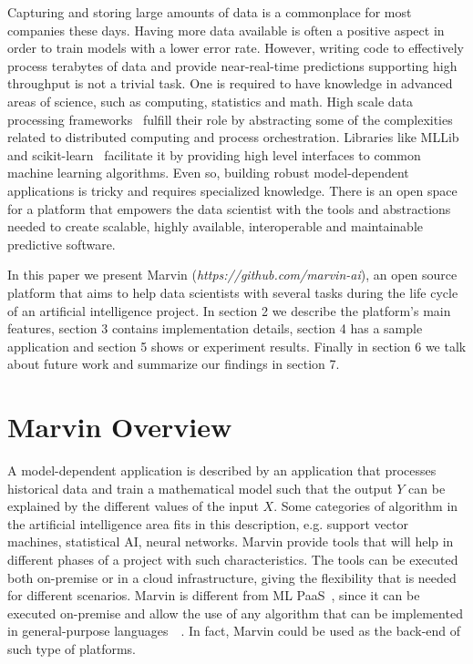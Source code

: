 \documentclass[twoside,11pt]{article}
\begin{document}
Capturing and storing large amounts of data is a commonplace for most companies these days. Having more data available is often a positive aspect in order to train models with a lower error rate. However, writing code to effectively process terabytes of data and provide near-real-time predictions supporting high throughput is not a trivial task. One is required to have knowledge in advanced areas of science, such as computing, statistics and math. High scale data processing frameworks~\citep{zaharia2010spark} fulfill their role by abstracting some of the complexities related to distributed computing and process orchestration. Libraries like MLLib~\citep{meng2015ml} and scikit-learn~\citep{pedregosa2011scikit} facilitate it by providing high level interfaces to common machine learning algorithms. Even so, building robust model-dependent applications is tricky and requires specialized knowledge. There is an open space for a platform that empowers the data scientist with the tools and abstractions needed to create scalable, highly available, interoperable and maintainable predictive software. 

In this paper we present Marvin (\textit{https://github.com/marvin-ai}), an open source platform that aims to help data scientists with several tasks during the life cycle of an artificial intelligence project. In section 2 we describe the platform's main features, section 3 contains implementation details, section 4 has a sample application and section 5 shows or experiment results. Finally in section 6 we talk about future work and summarize our findings in section 7.

\section{Marvin Overview}

A model-dependent application is described by an application that processes historical data and train a mathematical model such that the output $Y$ can be explained by the different values of the input $X$. Some categories of algorithm in the artificial intelligence area fits in this description, e.g. support vector machines, statistical AI, neural networks. Marvin provide tools that will help in different phases of a project with such characteristics. The tools can be executed both on-premise or in a cloud infrastructure, giving the flexibility that is needed for different scenarios. Marvin is different from ML PaaS~\citep{pmlr-v50-azureml15}, since it can be executed on-premise and allow the use of any algorithm that can be implemented in general-purpose languages~\citep{van2003python}~\citep{odersky2004scala}. In fact, Marvin could be used as the back-end of such type of platforms.
\end{document}
